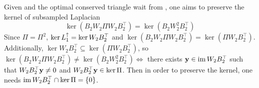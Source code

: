 \begin{remark}
      \label{rem:ker_im}
     Given  and the optimal conserved triangle wait from , one aims to preserve the kernel of subsampled Laplacian
\[
      \ker \left( B_2 W_2 \Pi W_2 B_2^\top \right) = \ker \left(  B_2  W_2^2 B_2^\top \right) 
\]
Since \( \Pi = \Pi^2 \), \( \ker L_{1}^{\uparrow} = \ker W_2 B_2^\top \) and \( \ker \left(   B_2 W_2 \Pi W_2 B_2^\top \right) = \ker \left( \Pi W_2 B_2^\top \right) \). Additionally, \( \ker W_2 B_2^\top \subseteq \ker \left( \Pi W_2 B_2^\top \right)  \), so \(  \ker \left(  B_2 W_2 \Pi W_2 B_2^\top \right) \ne \ker \left(  B_2 W_2^2 B_2^\top \right) \iff \) there exists \( \mathbf{y} \in \operatorname{im} W_2 B_2^\top\) such that \( W_2 B_2^\top \mathbf{y} \ne 0 \) and \( W_2 B_2^\top \mathbf{y} \in \ker \Pi\). Then in order to preserve the kernel, one needs 
\( \operatorname{im} W_2 B_2^\top \cap \ker \Pi = \{ 0 \} \). 
\end{remark}

